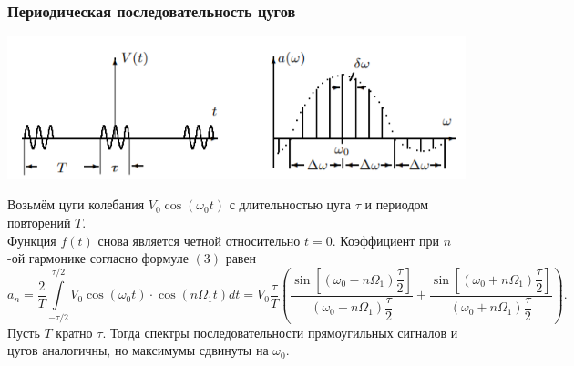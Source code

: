 \documentclass[12pt,a4paper]{article}
\begin{document}
\subsubsection*{Периодическая последовательность цугов}
\begin{center}
\includegraphics[scale=0.9]{s2.png}
\end{center}
Возьмём цуги колебания $V_0 \cos(\omega_0 t)$ с длительностью цуга $\tau$ и периодом повторений $T$.\\
Функция $f(t)$ снова является четной относительно $t = 0$. Коэффициент при $n$-ой гармонике согласно формуле $(3)$ равен
\begin{equation}
a_n = \dfrac{2}{T}\int\limits_{-\tau/2}^{\tau/2}V_0 \cos \left(\omega_0t\right) \cdot \cos\left(n \Omega_1t\right)dt = V_0 \dfrac{\tau}{T}\left( \dfrac{\sin\left[\left(\omega_0 - n \Omega_1\right)\dfrac{\tau}{2}\right]}{\left( \omega_0 - n \Omega_1\right) \dfrac{\tau}{2}} + \dfrac{\sin\left[\left(\omega_0 + n \Omega_1\right)\dfrac{\tau}{2}\right]}{\left( \omega_0 + n \Omega_1\right) \dfrac{\tau}{2}}\right).
\end{equation}
Пусть $T$ кратно $\tau$. Тогда спектры последовательности прямоугильных сигналов и цугов аналогичны, но максимумы сдвинуты на $\omega_0$.
\end{document}
